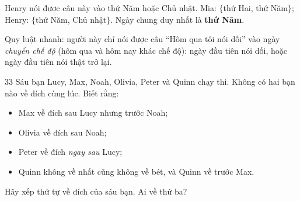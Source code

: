 {\begin{center}
\begin{tabular}{|l|c|c|c|c|c|c|c|}
\end{tabular}
\end{center}
Henry nói được câu này vào thứ Năm hoặc Chủ nhật.
Mia: $\{$thứ Hai, thứ Năm$\}$; Henry: $\{$thứ Năm, Chủ nhật$\}$. Ngày chung duy nhất là \textbf{thứ Năm}.
\begin{tipbox}Quy luật nhanh: người này chỉ nói được câu ``Hôm qua tôi nói dối'' vào ngày \emph{chuyển chế độ}
(hôm qua và hôm nay khác chế độ): ngày đầu tiên nói dối, hoặc ngày đầu tiên nói thật trở lại.\end{tipbox}
}

\begin{probbox}{33}{\relax}
Sáu bạn Lucy, Max, Noah, Olivia, Peter và Quinn chạy thi. Không có hai bạn nào về đích cùng lúc. Biết rằng:
\begin{itemize}[leftmargin=1.4em,itemsep=0pt,topsep=2pt]
  \item Max về đích sau Lucy nhưng trước Noah;
  \item Olivia về đích sau Noah;
  \item Peter về đích \emph{ngay sau} Lucy;
  \item Quinn không về nhất cũng không về bét, và Quinn về trước Max.
\end{itemize}
Hãy xếp thứ tự về đích của sáu bạn. Ai về thứ ba?
\end{probbox}
